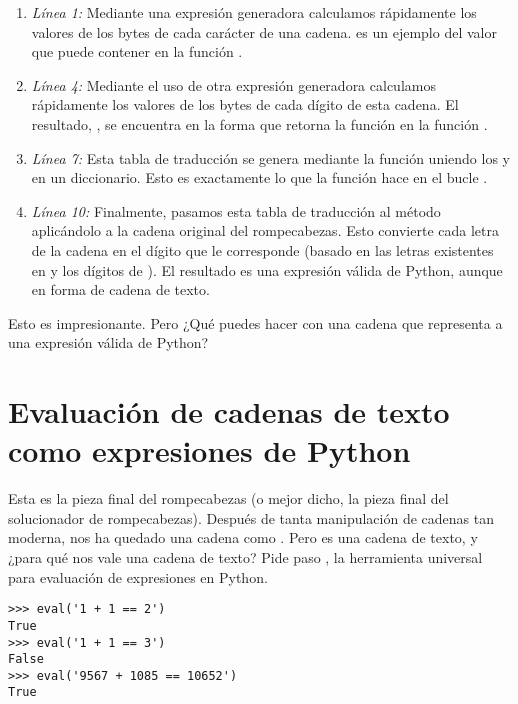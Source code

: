 \begin{enumerate}

\item \emph{Línea 1:} Mediante una expresión generadora calculamos rápidamente los valores de los bytes de cada carácter de una cadena.  es un ejemplo del valor que puede contener  en la función .

\item \emph{Línea 4:} Mediante el uso de otra expresión generadora calculamos rápidamente los valores de los bytes de cada dígito de esta cadena. El resultado, , se encuentra en la forma que retorna la función  en la función .

\item \emph{Línea 7:} Esta tabla de traducción se genera mediante la función  uniendo los  y  en un diccionario. Esto es exactamente lo que la función  hace en el bucle .

\item \emph{Línea 10:} Finalmente, pasamos esta tabla de traducción al método  aplicándolo a la cadena original del rompecabezas. Esto convierte cada letra de la cadena en el dígito que le corresponde (basado en las letras existentes en  y los dígitos de ). El resultado es una expresión válida de Python, aunque en forma de cadena de texto.

\end{enumerate}

Esto es impresionante. Pero ¿Qué puedes hacer con una cadena que representa a una expresión válida de Python?

\section{Evaluación de cadenas de texto como expresiones de Python}

Esta es la pieza final del rompecabezas (o mejor dicho, la pieza final del solucionador de rompecabezas). Después de tanta manipulación de cadenas tan moderna, nos ha quedado una cadena como . Pero es una cadena de texto, y ¿para qué nos vale una cadena de texto? Pide paso , la herramienta universal para evaluación de expresiones en Python.

\noindent\begin{minipage}{\textwidth}
\begin{lstlisting}[mathescape=True]
>>> eval('1 + 1 == 2')
True
>>> eval('1 + 1 == 3')
False
>>> eval('9567 + 1085 == 10652')
True
\end{lstlisting}
\end{minipage}

